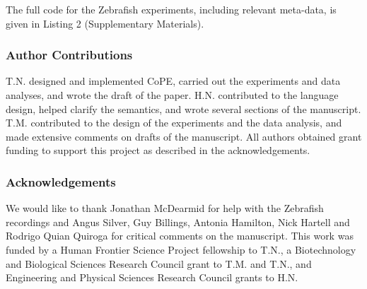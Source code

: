 The full code for the Zebrafish experiments, including relevant
meta-data, is given in Listing 2 (Supplementary Materials).

\subsubsection*{Author Contributions}  

T.N. designed and implemented CoPE, carried out the experiments and
data analyses, and wrote the draft of the paper. H.N. contributed to
the language design, helped clarify the semantics, and wrote several
sections of the manuscript. T.M. contributed to the design of the
experiments and the data analysis, and made extensive comments on
drafts of the manuscript. All authors obtained grant funding to
support this project as described in the acknowledgements.

\subsubsection*{Acknowledgements}  

We would like to thank Jonathan McDearmid for help with the Zebrafish
recordings and Angus Silver, Guy Billings, Antonia Hamilton, Nick
Hartell and Rodrigo Quian Quiroga for critical comments on the
manuscript. This work was funded by a Human Frontier Science Project
fellowship to T.N., a Biotechnology and Biological Sciences Research
Council grant to T.M. and T.N., and Engineering and Physical Sciences Research
Council grants to H.N.



